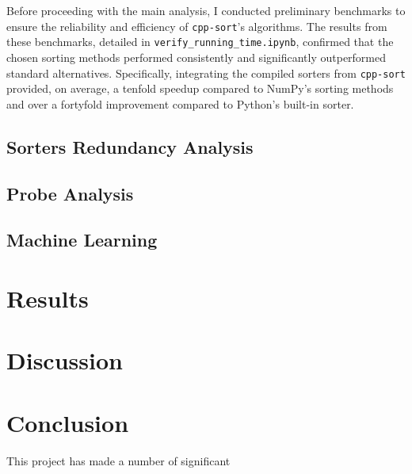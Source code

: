 \documentclass[twocolumn]{article}
\begin{document}
Before proceeding with the main analysis, I conducted preliminary benchmarks to ensure the reliability and efficiency of \texttt{cpp-sort}'s algorithms. The results from these benchmarks, detailed in \texttt{verify\_running\_time.ipynb}, confirmed that the chosen sorting methods performed consistently and significantly outperformed standard alternatives. Specifically, integrating the compiled sorters from \texttt{cpp-sort} provided, on average, a tenfold speedup compared to NumPy's sorting methods and over a fortyfold improvement compared to Python's built-in sorter.

\subsection{Sorters Redundancy Analysis}

\subsection{Probe Analysis}

\subsection{Machine Learning}

\section{Results}

\section{Discussion}

\section{Conclusion}
This project has made a number of significant 



\end{document}
